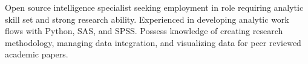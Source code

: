 \documentclass[letter,10pt]{article}
\begin{document}

Open source intelligence specialist seeking employment in role requiring analytic skill set and strong research ability. Experienced in developing analytic work flows with Python, SAS, and SPSS. Possess knowledge of creating research methodology, managing data integration, and visualizing data for peer reviewed academic papers.
\end{document}
